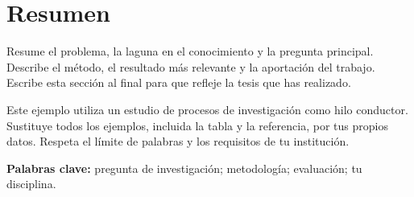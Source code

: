 \chapter*{Resumen}
Resume el problema, la laguna en el conocimiento y la pregunta principal.
Describe el método, el resultado más relevante y la aportación del trabajo.
Escribe esta sección al final para que refleje la tesis que has realizado.

Este ejemplo utiliza un estudio de procesos de investigación como hilo conductor.
Sustituye todos los ejemplos, incluida la tabla y la referencia, por tus propios
datos. Respeta el límite de palabras y los requisitos de tu institución.

\textbf{Palabras clave:} pregunta de investigación; metodología; evaluación; tu disciplina.
\vspace{12mm}
